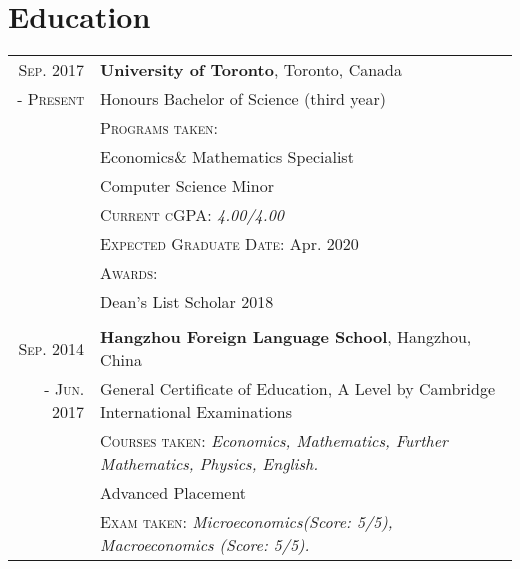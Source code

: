 \documentclass[a4paper,10pt]{article}
\begin{document}
\section{Education}
\begin{tabular}{rl}
    \textsc{Sep.} 2017 & \textbf{University of Toronto}, Toronto, Canada \\
    - \textsc{Present} & {Honours Bachelor of Science} (third year) \\
    & \textsc{Programs taken: } \\
    & \quad Economics\& Mathematics Specialist \\
    & \quad Computer Science Minor \\
    & \textsc{Current cGPA: } \emph{4.00/4.00} \\
    & \textsc{Expected Graduate Date: } Apr. 2020 \\
    & \textsc{Awards: } \\
    & \quad Dean's List Scholar 2018
    \\
    \quad
    \\
    \textsc{Sep.} 2014 & \textbf{Hangzhou Foreign Language School}, Hangzhou, China\\
    - \textsc{Jun.} 2017 & {General Certificate of Education, A Level by Cambridge International Examinations} \\
    & \quad \textsc{Courses taken}: \emph{Economics, Mathematics, Further Mathematics, Physics, English.} \\
    & {Advanced Placement} \\
    & \quad \textsc{Exam taken}: \emph{Microeconomics(Score: 5/5), Macroeconomics (Score: 5/5).} 


\end{tabular}
\end{document}
